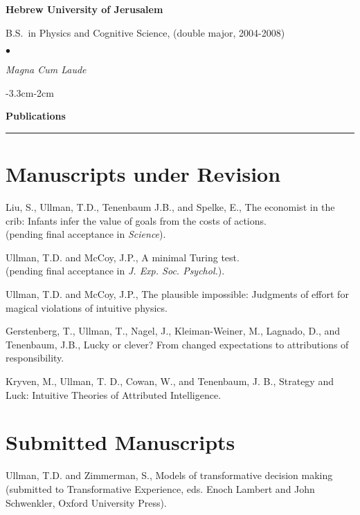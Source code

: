 \documentclass[margin,line,pifont,palatino,courier]{res}
\newenvironment{list1}{
  \begin{list}{\ding{113}}{%
      \setlength{\itemsep}{0in}
      \setlength{\parsep}{0in} \setlength{\parskip}{0in}
      \setlength{\topsep}{0in} \setlength{\partopsep}{0in}
      \setlength{\leftmargin}{0.17in}}}{\end{list}}
\newenvironment{list2}{
  \begin{list}{$\bullet$}{%
      \setlength{\itemsep}{0in}
      \setlength{\parsep}{0in} \setlength{\parskip}{0in}
      \setlength{\topsep}{0in} \setlength{\partopsep}{0in}
      \setlength{\leftmargin}{0.2in}}}{\end{list}}
\begin{document}
\begin{resume}
{\bf Hebrew University of Jerusalem}\\
\vspace*{-.1in}
\begin{list1}
\item[] B.S.~in Physics and Cognitive Science, (double major, 2004-2008)

\begin{list2}
\vspace*{.05in}
\item \textit{Magna Cum Laude}
\end{list2}

\end{list1}

\begin{adjustwidth*}{-3.3cm}{-2cm}

\textbf{Publications}\\
\noindent\rule{8cm}{0.4pt}

\end{adjustwidth*}

\section{\sc Manuscripts under Revision}

Liu, S., Ullman, T.D., Tenenbaum J.B., and Spelke, E., The economist in the crib: Infants infer the value of goals from the costs of actions. \\(pending final acceptance in \textit{Science}).

Ullman, T.D. and McCoy, J.P., A minimal Turing test.\\ (pending final acceptance in \textit{J. Exp. Soc. Psychol.}).

Ullman, T.D. and McCoy, J.P., The plausible impossible: Judgments of effort for magical violations of intuitive physics.

Gerstenberg, T., Ullman, T., Nagel, J., Kleiman-Weiner, M., Lagnado, D., and Tenenbaum, J.B., Lucky or clever? From changed expectations to attributions of responsibility.

Kryven, M., Ullman, T. D., Cowan, W., and Tenenbaum, J. B., Strategy and Luck: Intuitive Theories of Attributed Intelligence.

\section{\sc Submitted Manuscripts}

Ullman, T.D. and Zimmerman, S., Models of transformative decision making (submitted to Transformative Experience, eds. Enoch Lambert and John Schwenkler, Oxford University Press).


\end{resume}
\end{document}
